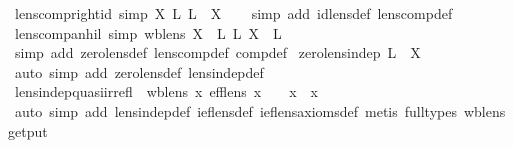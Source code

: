\begin{isabellebody}
\endisadelimproof
\isanewline
{}\isamarkupfalse%
\ lens{\isacharunderscore}comp{\isacharunderscore}right{\isacharunderscore}id\ {\isacharbrackleft}simp{\isacharbrackright}{\isacharcolon}\ {\isachardoublequoteopen}X\ {\isacharsemicolon}\isactrlsub L\ {}\isactrlsub L\ {\isacharequal}\ X{\isachardoublequoteclose}\isanewline
%
\isadelimproof
\ \ %
\endisadelimproof
%
\isatagproof
{}\isamarkupfalse%
\ {\isacharparenleft}simp\ add{\isacharcolon}\ id{\isacharunderscore}lens{\isacharunderscore}def\ lens{\isacharunderscore}comp{\isacharunderscore}def{\isacharparenright}%
\endisatagproof
{\isafoldproof}%
%
\isadelimproof
\isanewline
%
\endisadelimproof
\isanewline
{}\isamarkupfalse%
\ lens{\isacharunderscore}comp{\isacharunderscore}anhil\ {\isacharbrackleft}simp{\isacharbrackright}{\isacharcolon}\ {\isachardoublequoteopen}wb{\isacharunderscore}lens\ X\ {\isasymLongrightarrow}\ {}\isactrlsub L\ {\isacharsemicolon}\isactrlsub L\ X\ {\isacharequal}\ {}\isactrlsub L{\isachardoublequoteclose}\isanewline
%
\isadelimproof
\ \ %
\endisadelimproof
%
\isatagproof
{}\isamarkupfalse%
\ {\isacharparenleft}simp\ add{\isacharcolon}\ zero{\isacharunderscore}lens{\isacharunderscore}def\ lens{\isacharunderscore}comp{\isacharunderscore}def\ comp{\isacharunderscore}def{\isacharparenright}%
\endisatagproof
{\isafoldproof}%
%
\isadelimproof
%
\endisadelimproof
%
\isamarkuptrue%
\isamarkupfalse%
\ zero{\isacharunderscore}lens{\isacharunderscore}indep{\isacharcolon}\ {\isachardoublequoteopen}{}\isactrlsub L\ {\isasymbowtie}\ X{\isachardoublequoteclose}\isanewline
%
\isadelimproof
\ \ %
\endisadelimproof
%
\isatagproof
{}\isamarkupfalse%
\ {\isacharparenleft}auto\ simp\ add{\isacharcolon}\ zero{\isacharunderscore}lens{\isacharunderscore}def\ lens{\isacharunderscore}indep{\isacharunderscore}def{\isacharparenright}%
\endisatagproof
{\isafoldproof}%
%
\isadelimproof
\isanewline
%
\endisadelimproof
\ \ \isanewline
{}\isamarkupfalse%
\ lens{\isacharunderscore}indep{\isacharunderscore}quasi{\isacharunderscore}irrefl{\isacharcolon}\ {\isachardoublequoteopen}{\isasymlbrakk}\ wb{\isacharunderscore}lens\ x{\isacharsemicolon}\ eff{\isacharunderscore}lens\ x\ {\isasymrbrakk}\ {\isasymLongrightarrow}\ {\isasymnot}\ {\isacharparenleft}x\ {\isasymbowtie}\ x{\isacharparenright}{\isachardoublequoteclose}\isanewline
%
\isadelimproof
\ \ %
\endisadelimproof
%
\isatagproof
{}\isamarkupfalse%
\ {\isacharparenleft}auto\ simp\ add{\isacharcolon}\ lens{\isacharunderscore}indep{\isacharunderscore}def\ ief{\isacharunderscore}lens{\isacharunderscore}def\ ief{\isacharunderscore}lens{\isacharunderscore}axioms{\isacharunderscore}def{\isacharcomma}\ metis\ {\isacharparenleft}full{\isacharunderscore}types{\isacharparenright}\ wb{\isacharunderscore}lens{\isachardot}get{\isacharunderscore}put{\isacharparenright}%

\end{isabellebody}
